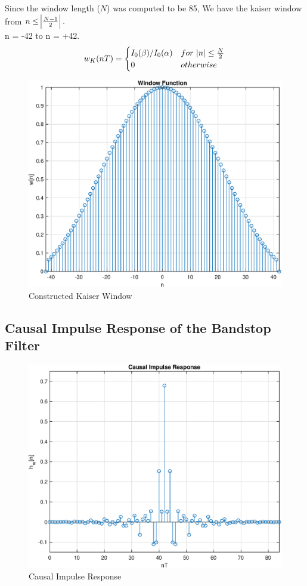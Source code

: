 \documentclass[11pt]{article}
\begin{document}
Since the window length ($N$) was computed to be 85, 
We have the kaiser window from $n \leq \abs{\frac{N-1}{2}}.$ \\ n = -42 to n = +42.
\[
	w_K(nT) = \begin{cases}
	I_0(\beta)/I_0(\alpha) & for \hspace*{3pt} \abs{n}  \leq \frac{N}{2}  \\
	0 & otherwise 
	\end{cases}
\]

\begin{figure}[H]
    \centering
    \includegraphics[scale=0.7]{kaiser.eps} 
    \caption{Constructed Kaiser Window}
    \label{fig:kaiser}
\end{figure}

\subsection{Causal Impulse Response of the Bandstop Filter}
\begin{figure}[H]
    \centering
    \includegraphics[scale=0.7]{cir.eps} 
    \caption{Causal Impulse Response}
    \label{fig:kaiser}
\end{figure}
\end{document}
